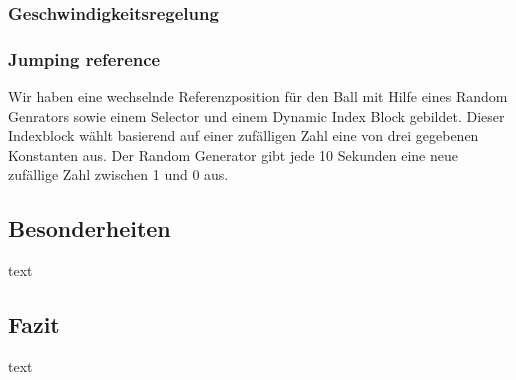 \subsubsection{Geschwindigkeitsregelung}

\subsubsection{Jumping reference}
Wir haben eine wechselnde Referenzposition für den Ball mit Hilfe eines Random Genrators sowie einem Selector und einem Dynamic Index Block gebildet. Dieser Indexblock wählt basierend auf einer zufälligen Zahl eine von drei gegebenen Konstanten aus. Der Random Generator gibt jede 10 Sekunden eine neue zufällige Zahl zwischen 1 und 0 aus.

\subsection{Besonderheiten}
text

\subsection{Fazit}
text
